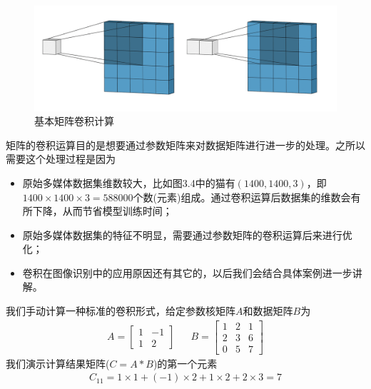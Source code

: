 \documentclass[12pt]{article}
\numberwithin{figure}{section}
\numberwithin{equation}{section}
\begin{document}
\begin{figure}[H]
	\centering
	\includegraphics[width=\textwidth]{fig/mtconvo}
	\caption{基本矩阵卷积计算}
\end{figure}

\begin{remark}
	矩阵的卷积运算目的是想要通过参数矩阵来对数据矩阵进行进一步的处理。之所以需要这个处理过程是因为
	\begin{itemize}
		\item 原始多媒体数据集维数较大，比如图3.4中的猫有$(1400, 1400, 3)$，即$1400 \times 1400 \times 3 = 588000$个数(元素)组成。通过卷积运算后数据集的维数会有所下降，从而节省模型训练时间；
		\item 原始多媒体数据集的特征不明显，需要通过参数矩阵的卷积运算后来进行优化；
		\item 卷积在图像识别中的应用原因还有其它的，以后我们会结合具体案例进一步讲解。
	\end{itemize}
\end{remark}

\begin{example}
我们手动计算一种标准的卷积形式，给定参数核矩阵$A$和数据矩阵$B$为
\begin{align*}
	A = \begin{bmatrix}
		1 & -1 \\
		1 & 2 
	\end{bmatrix} & & B= \begin{bmatrix}
		1 & 2 & 1 \\
		2 & 3 & 6 \\
		0 & 5 & 7 
	\end{bmatrix}
\end{align*}	
我们演示计算结果矩阵($C = A*B$)的第一个元素
\begin{align*}
	C_{11} = 1\times 1 + (-1) \times 2 + 1 \times 2 + 2 \times 3 = 7 
\end{align*}
\end{example}
\end{document}
